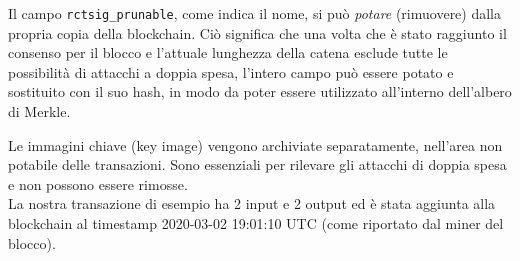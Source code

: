 \begin{appendices}

Il campo {\tt rctsig\_prunable}, come indica il nome, si può {\sl potare} (rimuovere) dalla propria copia della blockchain. Ciò significa che una volta che è stato raggiunto il consenso per il blocco e l'attuale lunghezza della catena esclude tutte le possibilità di attacchi a doppia spesa, l'intero campo può essere potato e sostituito con il suo hash, in modo da poter essere utilizzato all'interno dell'albero di Merkle.

Le immagini chiave (key image) vengono archiviate separatamente, nell'area non potabile delle transazioni. Sono essenziali per rilevare gli attacchi di doppia spesa e non possono essere rimosse.
\\

La nostra transazione di esempio ha 2 input e 2 output ed è stata aggiunta alla blockchain al timestamp 2020-03-02 19:01:10 UTC (come riportato dal miner del blocco).


\end{appendices}
